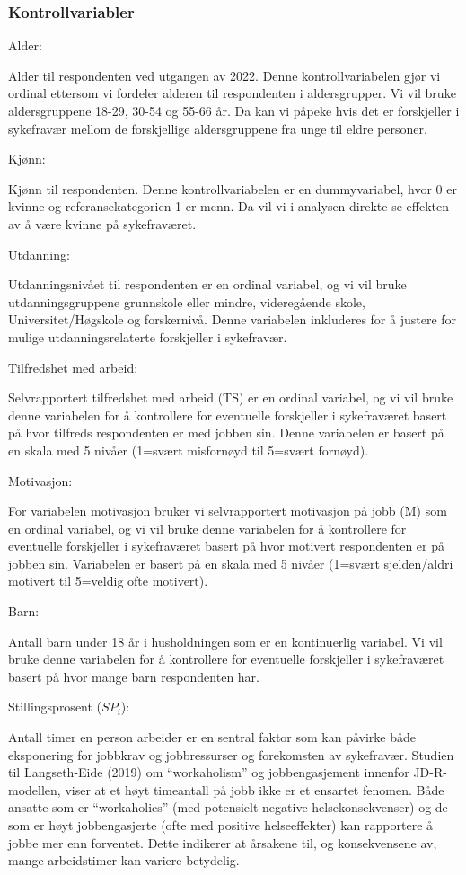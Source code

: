 \documentclass[
  12pt,
  a4paper,
  DIV=11,
  numbers=noendperiod]{scrartcl}
\begin{document}
\subsubsection{Kontrollvariabler}\label{kontrollvariabler}

Alder:

Alder til respondenten ved utgangen av 2022. Denne kontrollvariabelen
gjør vi ordinal ettersom vi fordeler alderen til respondenten i
aldersgrupper. Vi vil bruke aldersgruppene 18-29, 30-54 og 55-66 år. Da
kan vi påpeke hvis det er forskjeller i sykefravær mellom de
forskjellige aldersgruppene fra unge til eldre personer.

Kjønn:

Kjønn til respondenten. Denne kontrollvariabelen er en dummyvariabel,
hvor 0 er kvinne og referansekategorien 1 er menn. Da vil vi i analysen
direkte se effekten av å være kvinne på sykefraværet.

Utdanning:

Utdanningsnivået til respondenten er en ordinal variabel, og vi vil
bruke utdanningsgruppene grunnskole eller mindre, videregående skole,
Universitet/Høgskole og forskernivå. Denne variabelen inkluderes for å
justere for mulige utdanningsrelaterte forskjeller i sykefravær.

Tilfredshet med arbeid:

Selvrapportert tilfredshet med arbeid (TS) er en ordinal variabel, og vi
vil bruke denne variabelen for å kontrollere for eventuelle forskjeller
i sykefraværet basert på hvor tilfreds respondenten er med jobben sin.
Denne variabelen er basert på en skala med 5 nivåer (1=svært misfornøyd
til 5=svært fornøyd).

Motivasjon:

For variabelen motivasjon bruker vi selvrapportert motivasjon på jobb
(M) som en ordinal variabel, og vi vil bruke denne variabelen for å
kontrollere for eventuelle forskjeller i sykefraværet basert på hvor
motivert respondenten er på jobben sin. Variabelen er basert på en skala
med 5 nivåer (1=svært sjelden/aldri motivert til 5=veldig ofte
motivert).

Barn:

Antall barn under 18 år i husholdningen som er en kontinuerlig variabel.
Vi vil bruke denne variabelen for å kontrollere for eventuelle
forskjeller i sykefraværet basert på hvor mange barn respondenten har.

Stillingsprosent (\(SP_i\)):

Antall timer en person arbeider er en sentral faktor som kan påvirke
både eksponering for jobbkrav og jobbressurser og forekomsten av
sykefravær. Studien til Langseth-Eide (2019) om ``workaholism'' og
jobbengasjement innenfor JD-R-modellen, viser at et høyt timeantall på
jobb ikke er et ensartet fenomen. Både ansatte som er ``workaholics''
(med potensielt negative helsekonsekvenser) og de som er høyt
jobbengasjerte (ofte med positive helseeffekter) kan rapportere å jobbe
mer enn forventet. Dette indikerer at årsakene til, og konsekvensene av,
mange arbeidstimer kan variere betydelig.
\end{document}
